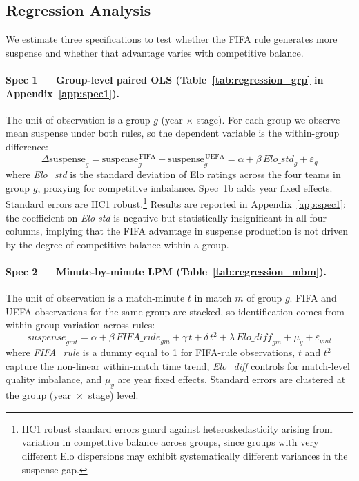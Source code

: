 \documentclass[11pt]{article}
\begin{document}
\subsection{Regression Analysis}

We estimate three specifications to test whether the FIFA rule generates more suspense and whether that advantage varies with competitive balance.

\paragraph{Spec 1 — Group-level paired OLS (Table~\ref{tab:regression_grp} in Appendix~\ref{app:spec1}).}
The unit of observation is a group $g$ (year $\times$ stage). For each group we observe mean suspense under both rules, so the dependent variable is the within-group difference:
\[
\Delta\overline{\text{suspense}}_g
  = \overline{\text{suspense}}^{\,\text{FIFA}}_g - \overline{\text{suspense}}^{\,\text{UEFA}}_g
  = \alpha + \beta\,\textit{Elo\_std}_g + \varepsilon_g
\]
where \textit{Elo\_std} is the standard deviation of Elo ratings across the four teams in group $g$, proxying for competitive imbalance. Spec~1b adds year fixed effects. Standard errors are HC1 robust.\footnote{HC1 robust standard errors guard against heteroskedasticity arising from variation in competitive balance across groups, since groups with very different Elo dispersions may exhibit systematically different variances in the suspense gap.} Results are reported in Appendix~\ref{app:spec1}: the coefficient on \textit{Elo std} is negative but statistically insignificant in all four columns, implying that the FIFA advantage in suspense production is not driven by the degree of competitive balance within a group.

\paragraph{Spec 2 — Minute-by-minute LPM (Table~\ref{tab:regression_mbm}).}
The unit of observation is a match-minute $t$ in match $m$ of group $g$. FIFA and UEFA observations for the same group are stacked, so identification comes from within-group variation across rules:
\[
\textit{suspense}_{gmt}
  = \alpha + \beta\,\textit{FIFA\_rule}_{gm}
  + \gamma\,t + \delta\,t^2
  + \lambda\,\textit{Elo\_diff}_{gm}
  + \mu_y + \varepsilon_{gmt}
\]
where \textit{FIFA\_rule} is a dummy equal to 1 for FIFA-rule observations, $t$ and $t^2$ capture the non-linear within-match time trend, \textit{Elo\_diff} controls for match-level quality imbalance, and $\mu_y$ are year fixed effects. Standard errors are clustered at the group (year~$\times$~stage) level.
\end{document}
